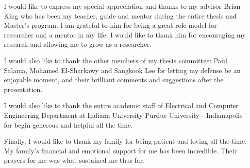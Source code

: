 
%
%
%
%
%


\begin{acknowledgments}
  I would like to express my special appreciation and thanks to my advisor Brian King who has been my teacher, guide and mentor during the entire thesis and Master's program.
  I am grateful to him for being a great role model for researcher and a mentor in my life.
  I would like to thank him for encouraging my research and allowing me to grow as a researcher.

  I would also like to thank the other members of my thesis committee: Paul Salama, Mohamed El-Sharkawy and Sangkook Lee for letting my defense be an enjoyable moment, and their brilliant comments and suggestions after the presentation. 

  I would also like to thank the entire academic staff of Electrical and Computer Engineering Department at Indiana University Purdue University - Indianapolis for begin generous and helpful all the time. 

  Finally, I would like to thank my family for being patient and loving all the time.
  My family's financial and emotional support for me has been incredible.
  Their prayers for me was what sustained me thus far.    

\end{acknowledgments}

